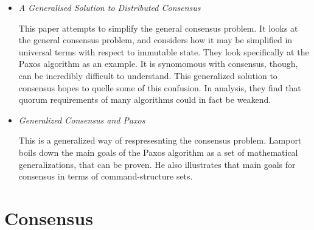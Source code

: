 \documentclass{article}
\begin{document}
\begin{itemize}

	\item
	\textit{A Generalised Solution to Distributed Consensus} \cite{HowardGeneralized}

	This paper attempts to simplify the general consensus problem. It looks at the general consensus problem, and considers how it may be simplified in universal terms with respect to immutable state. They look specifically at the Paxos algorithm as an example. 
	It is synomomous with consensus, though, can be incredibly difficult to understand. This generalized solution to consensus hopes to quelle some of this confusion.
	In analysis, they find that quorum requirements of many algorithms could in fact be weakend.

	\item
	\textit{Generalized Consensus and Paxos} \cite{lamport2005generalized}

	This is a generalized way of respresesnting the consensus problem.
	Lamport boils down the main goals of the Paxos algorithm as a set of mathematical generalizations, that can be proven. He also illustrates that main goals for consensus in terms of command-structure sets.


\end{itemize}

\section{Consensus}
\end{document}
